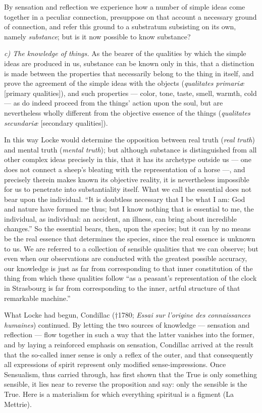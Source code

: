 \documentclass[12pt]{book}
\begin{document}
By sensation and reflection we experience how a number of simple ideas come
together in a peculiar connection, presuppose on that account a necessary ground
of connection, and refer this ground to a substratum subsisting on its own,
namely \emph{substance}; but is it now possible to know substance?

\emph{c) The knowledge of things.} As the bearer of the qualities by which the
simple ideas are produced in us, substance can be known only in this, that a
distinction is made between the properties that necessarily belong to the thing in
itself, and prove the agreement of the simple ideas with the objects
(\textit{qualitates primariæ} [primary qualities]), and such properties --- color,
tone, taste, smell, warmth, cold --- as do indeed proceed from the things' action
upon the soul, but are nevertheless wholly different from the objective essence of
the things (\textit{qualitates secundariæ} [secondary qualities]).

In this way Locke would determine the opposition between real truth
(\textit{real truth}) and mental truth (\textit{mental truth}); but although
substance is distinguished from all other complex ideas precisely in this, that it
has its archetype outside us --- one does not connect a sheep's bleating with the
representation of a horse ---, and precisely therein makes known its objective
reality, it is nevertheless impossible for us to penetrate into substantiality
itself.
What we call the essential does not bear upon the individual. ``It is doubtless
necessary that I be what I am: God and nature have formed me thus; but I know
nothing that is essential to me, the individual, as individual: an accident, an
illness, can bring about incredible changes.'' So the essential bears, then, upon
the species; but it can by no means be the real essence that determines the
species, since the real essence is unknown to us. We are referred to a collection
of sensible qualities that we can observe; but even when our observations are
conducted with the greatest possible accuracy, our knowledge is just as far from
corresponding to that inner constitution of the thing from which these qualities
follow ``as a peasant's representation of the clock in Strasbourg is far from
corresponding to the inner, artful structure of that remarkable machine.''

What Locke had begun, Condillac (†1780; \textit{Essai sur l'origine des
connaissances humaines}) continued. By letting the two sources of knowledge ---
sensation and reflection --- flow together in such a way that the latter vanishes
into the former, and by laying a reinforced emphasis on sensation, Condillac
arrived at the result that the so-called inner sense is only a reflex of the
outer, and that consequently all expressions of spirit represent only modified
sense-impressions. Once Sensualism, thus carried through, has first shown that the
True is only something sensible, it lies near to reverse the proposition and say:
only the sensible is the True. Here is a materialism for which everything
spiritual is a figment (La Mettrie).
\end{document}
